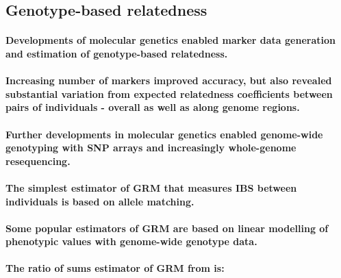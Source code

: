 {%

\subsection{Genotype-based relatedness}

\paragraph{Developments of molecular genetics enabled marker data
generation and estimation of genotype-based relatedness.}

\paragraph{Increasing number of markers improved accuracy, but also
revealed substantial variation from expected relatedness coefficients
between pairs of individuals - overall as well as along genome regions.}

\paragraph{Further developments in molecular genetics enabled genome-wide
genotyping with SNP arrays and increasingly whole-genome resequencing.}

\paragraph{The simplest estimator of GRM that measures IBS between
individuals is based on allele matching.}

\paragraph{Some popular estimators of GRM are based on linear
modelling of phenotypic values with genome-wide genotype data.}

\paragraph{The ratio of sums estimator of GRM from \cite{vanraden2008efficient} is:}

}
